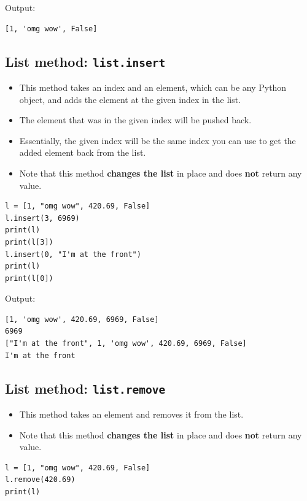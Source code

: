 \documentclass[11pt]{article}
\begin{document}
 \noindent Output:

\begin{verbatim}
[1, 'omg wow', False]
\end{verbatim}

\subsection{List method: \texttt{list.insert}}
\label{sec:org8cf56d3}
\begin{itemize}
\item This method takes an index and an element, which can be any Python object, and adds the element at the given index in the list.
\item The element that was in the given index will be pushed back.
\item Essentially, the given index will be the same index you can use to get the added element back from the list.
\item Note that this method \textbf{changes the list} in place and does \textbf{not} return any value.
\end{itemize}

\begin{verbatim}
l = [1, "omg wow", 420.69, False]
l.insert(3, 6969)
print(l)
print(l[3])
l.insert(0, "I'm at the front")
print(l)
print(l[0])
\end{verbatim}

 \noindent Output:

\begin{verbatim}
[1, 'omg wow', 420.69, 6969, False]
6969
["I'm at the front", 1, 'omg wow', 420.69, 6969, False]
I'm at the front
\end{verbatim}

\subsection{List method: \texttt{list.remove}}
\label{sec:org860cb52}
\begin{itemize}
\item This method takes an element and removes it from the list.
\item Note that this method \textbf{changes the list} in place and does \textbf{not} return any value.
\end{itemize}

\begin{verbatim}
l = [1, "omg wow", 420.69, False]
l.remove(420.69)
print(l)
\end{verbatim}
\end{document}
